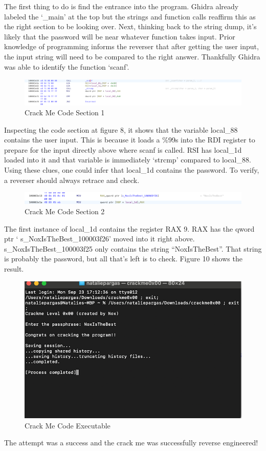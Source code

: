The first thing to do is find the entrance into the program. 
Ghidra already labeled the ‘\_main’ at the top but the strings and function calls reaffirm this as the right section to be looking over. 
Next, thinking back to the string dump, it’s likely that the password will be near whatever function takes input. 
Prior knowledge of programming informs the reverser that after getting the user input, the input string will need to be compared to the right answer. 
Thankfully Ghidra was able to identify the function ‘scanf’.

\begin{figure}[h]
	\caption{Crack Me Code Section 1}
	\includegraphics{crackmescanf.png}
\end{figure}

Inspecting the code section at figure 8, it shows that the variable local\_88 contains the user input. 
This is because it loads a \%99s into the RDI register to prepare for the input directly above where scanf is called. 
RSI has local\_1d loaded into it and that variable is immediately ‘strcmp’ compared to local\_88. Using these clues, one could infer that local\_1d contains the password. 
To verify, a reverser should always retrace and check.

\begin{figure}[h]
	\caption{Crack Me Code Section 2}
	\includegraphics{crackmeRAX.png}
\end{figure}

The first instance of local\_1d contains the register RAX 9. 
RAX has the qword ptr ‘ s\_NoxIsTheBest\_100003f26’ moved into it right above. 
s\_NoxIsTheBest\_100003f25 only contains the string “NoxIsTheBest”. 
That string is probably the password, but all that’s left is to check. 
Figure 10 shows the result.
\clearpage
\begin{figure}[h!]
	\caption{Crack Me Code Executable}
	\includegraphics[]{crackmeexe.png}
\end{figure}
The attempt was a success and the crack me was successfully reverse engineered!
